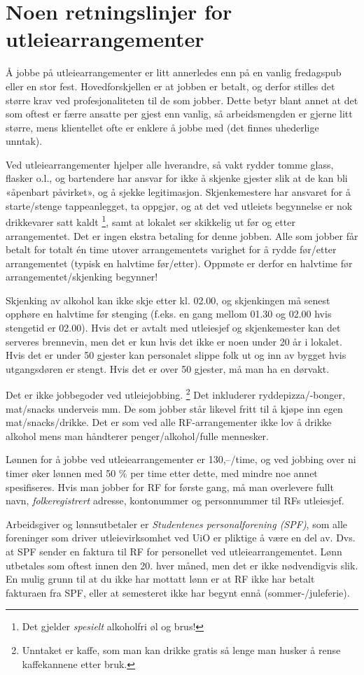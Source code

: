 \documentclass[norsk, 12pt]{article}
\title{}
\begin{document}
\section*{Noen retningslinjer for utleiearrangementer}
Å jobbe på utleiearrangementer er litt annerledes enn på en vanlig fredagspub eller
en stor fest. Hovedforskjellen er at jobben er betalt, og derfor stilles det større krav 
ved profesjonaliteten til de som jobber. 
Dette betyr blant annet at det som oftest er færre ansatte per gjest 
enn vanlig, så arbeidsmengden er gjerne litt større, mens klientellet ofte er 
enklere å jobbe med (det finnes uhederlige unntak).

Ved utleiearrangementer hjelper alle hverandre, så vakt rydder tomme glass, flasker o.l.,
og bartendere har ansvar for ikke å skjenke gjester slik at de kan bli «åpenbart påvirket»,
og å sjekke legitimasjon.
Skjenkemestere har ansvaret for å starte/stenge tappeanlegget, ta oppgjør,
og at det ved utleiets begynnelse er nok drikkevarer satt kaldt
\footnote{Det gjelder
\textit{spesielt} alkoholfri øl og brus!}, 
samt at lokalet ser
skikkelig ut før og etter arrangementet. Det er ingen ekstra betaling for
denne jobben. Alle som jobber får betalt for totalt én time utover arrangementets
varighet for å rydde før/etter arrangementet (typisk en halvtime før/etter).
Oppmøte er derfor en halvtime før arrangementet/skjenking begynner!

Skjenking av alkohol kan ikke skje etter kl. 02.00, og skjenkingen må
senest opphøre en halvtime før stenging 
(f.eks. en gang mellom 01.30 og 02.00 hvis stengetid er 02.00).
Hvis det er avtalt med utleiesjef og skjenkemester kan det serveres brennevin,
men det er kun hvis det ikke er noen under 20 år i lokalet. 
Hvis det er under 50 gjester kan personalet slippe folk ut og inn av bygget
hvis utgangsdøren er stengt. Hvis det er over 50 gjester, må man ha en dørvakt.

Det er ikke jobbegoder ved utleiejobbing.
\footnote{Unntaket er kaffe, 
som man kan drikke gratis så lenge man husker å rense kaffekannene etter bruk.}
Det inkluderer ryddepizza/-bonger, 
mat/snacks underveis mm. De som jobber står likevel fritt til å kjøpe inn egen 
mat/snacks/drikke.
Det er som ved alle RF-arrangementer ikke lov å drikke alkohol mens man 
håndterer penger/alkohol/fulle mennesker.

Lønnen for å jobbe ved utleiearrangementer er 130,–/time, og ved jobbing over ni timer
øker lønnen med 50 \% per time etter dette, med mindre noe annet spesifiseres.
Hvis man jobber for RF for første gang, må man overlevere fullt navn, 
\textit{folkeregistrert} adresse, kontonummer og personnummer til RFs utleiesjef.

Arbeidsgiver og lønnsutbetaler er \textit{Studentenes personalforening (SPF)}, 
som alle foreninger som driver utleievirksomhet ved UiO er pliktige å være en del av.
Dvs. at SPF sender en faktura til RF for personellet ved utleiearrangementet.
Lønn utbetales som oftest innen den 20. hver måned, men det er ikke nødvendigvis slik.
En mulig grunn til at du ikke har mottatt lønn er at RF ikke har betalt fakturaen fra
SPF, eller at semesteret ikke har begynt ennå (sommer-/juleferie).
\end{document}
